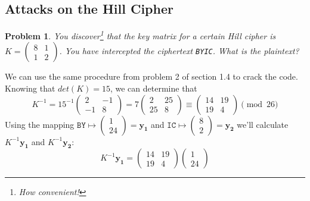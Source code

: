 \documentclass[12pt]{article}
\newenvironment{answer}
    {\begin{adjustwidth}{0pt}{0pt}}
    {\end{adjustwidth}}
\newtheorem{problem}{Problem}
\theoremstyle{remark}  %
\begin{document}
\subsection{Attacks on the Hill Cipher}
\setcounter{problem}{0}
    \begin{problem}
        You discover\footnote{How convenient!} that the key matrix for a certain Hill cipher is $K=\begin{pmatrix}
            8 & 1 \\
            1 & 2
        \end{pmatrix}$. You have intercepted the ciphertext \texttt{BYIC}. What is the plaintext?
    \end{problem}
    \begin{answer}
        We can use the same procedure from problem 2 of section 1.4 to crack the code. Knowing that $det(K)=15$, we can determine that $$
            K^{-1}=15^{-1}\begin{pmatrix}
                2 & -1 \\
                -1 & 8
            \end{pmatrix} = 7
            \begin{pmatrix}
                2 & 25 \\
                25 & 8
            \end{pmatrix} \equiv
            \begin{pmatrix}
                14 & 19 \\
                19 & 4
            \end{pmatrix} \pmod{26}
        $$ Using the mapping $\texttt{BY}\mapsto \begin{pmatrix}
            1 \\
            24
        \end{pmatrix}=\mathbf{y_1}$ and $\texttt{IC}\mapsto \begin{pmatrix}
            8 \\
            2
        \end{pmatrix}=\mathbf{y_2}$ we'll calculate $K^{-1}\mathbf{y_1}$ and $K^{-1}\mathbf{y_2}$: $$
            K^{-1}\mathbf{y_1} = \begin{pmatrix}
                14 & 19 \\
                19 & 4
            \end{pmatrix}
            \begin{pmatrix}
                1 \\
                24

\end{pmatrix}$$
\end{answer}
\end{document}
